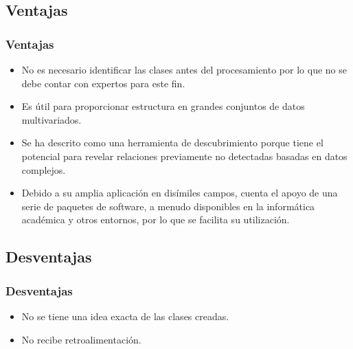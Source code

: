 \documentclass[t,compress,10pt,xcolor=dvipsnames]{beamer}
\begin{document}
	\subsection{Ventajas}
	\frame
	{
		\frametitle{Ventajas}
		\vspace{2.5em}
		\begin{itemize}
			\item No es necesario identificar las clases antes del procesamiento por lo que no se debe contar con expertos para este fin.
			
			\item Es útil para proporcionar estructura en grandes conjuntos de datos multivariados.
			
			\item Se ha descrito como una herramienta de descubrimiento porque tiene el potencial para revelar relaciones previamente no detectadas basadas en datos complejos.
			
			\item Debido a su amplia aplicación en dis\'imiles campos, cuenta el apoyo de una serie de paquetes de software, a menudo disponibles en la informática académica y otros entornos, por lo que se facilita su utilizaci\'on.
		\end{itemize}
	}

	\subsection{Desventajas}
	\frame
	{
		\frametitle{Desventajas}
		\vspace{6em}
		\begin{itemize}
			\item No se tiene una idea exacta de las clases creadas.
			\item No recibe retroalimentaci\'on.
		\end{itemize}
	}
\end{document}
